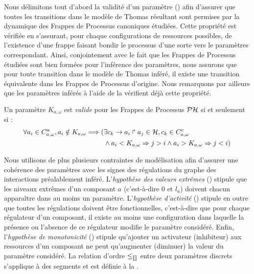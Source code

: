 \myskip

Nous délimitons tout d'abord la validité d'un paramètre () afin d'assurer
que toutes les transitions dans le modèle de Thomas résultant
sont permises par la dynamique des Frappes de Processus canoniques étudiées.
Cette propriété est vérifiée en s'assurant,
pour chaque configurations de ressources possibles,
de l'existence d'une frappe faisant bondir
le processus d'une sorte vers le paramètres correspondant.
Ainsi, conjointement avec le fait que les Frappes de Processus étudiées
sont bien formées pour l'inférence des paramètres,
nous assurons que pour toute transition dans le modèle de Thomas inféré,
il existe une transition équivalente dans les Frappes de Processus d'origine.
Nous remarquons par ailleurs que les paramètres inférés à l'aide de la 
vérifient déjà cette propriété.

\begin{critere}
  Un paramètre $K_{a,\omega}$ est \emph{valide} pour les Frappes de Processus $\mathcal{PH}$
  si et seulement si :
  \begin{align*}
    \forall a_i\in C^a_{a,\omega}, a_i \notin K_{a,\omega} \Longrightarrow
      (& \exists c_k\rightarrow a_i\Rsh a_j\in\mathcal{H}, c_k \in C^c_{a,\omega} \\
      & \wedge a_i < K_{a,\omega} \Rightarrow j > i \wedge  a_i > K_{a,\omega} \Rightarrow j <i )
  \end{align*}
\end{critere}

Nous utilisons de plus plusieurs contraintes de modélisation 
afin d'assurer une cohérence des paramètres avec les signes des régulations du graphe
des interactions préalablement inféré.
L'\emph{hypothèse des valeurs extrêmes} ()
stipule que les niveaux extrêmes d'un composant $a$ (c'est-à-dire $0$ et $l_a$)
doivent chacun apparaître dans au moins un paramètre.
L'\emph{hypothèse d'activité} ()
stipule en outre que toutes les régulations doivent être fonctionnelles,
c'est-à-dire que pour chaque régulateur d'un composant,
il existe au moins une configuration dans laquelle la présence ou l'absence de ce régulateur
modifie le paramètre considéré.
Enfin, l'\emph{hypothèse de monotonicité} ()
stipule qu'ajouter un activateur (\resp inhibiteur) aux ressources d'un composant
ne peut qu'augmenter (\resp diminuer) la valeur du paramètre considéré.
La relation d'ordre $\leq_{\llbracket\rrbracket}$ entre deux paramètres discrets s'applique à des segments
et est définie à la .

